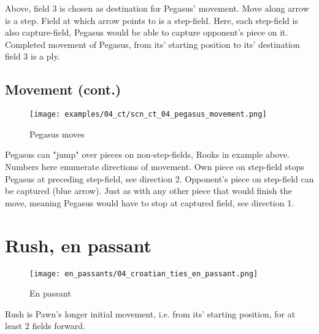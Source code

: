 Above, field 3 is chosen as destination for Pegasus' movement. Move along arrow is a step.
Field at which arrow points to is a step-field. Here, each step-field is also capture-field,
Pegasus would be able to capture opponent's piece on it. Completed movement of Pegasus,
from its' starting position to its' destination field 3 is a ply.

\clearpage %

\subsection*{Movement (cont.)}

\noindent
\begin{figure}[!h]
\vspace{-1.2\baselineskip}
\texttt{[image: examples/04\_ct/scn\_ct\_04\_pegasus\_movement.png]}
\caption{Pegasus moves}
\label{fig:scn_ct_04_pegasus_movement}
\end{figure}

Pegasus can "jump" over pieces on non-step-fields, Rooks in example above. Numbers
here enumerate directions of movement. Own piece on step-field stops Pegasus at
preceding step-field, see direction 2. Opponent's piece on step-field can be captured
(blue arrow). Just as with any other piece that would finish the move, meaning Pegasus
would have to stop at captured field, see direction 1.

\clearpage %

\section*{Rush, en passant}

\noindent
\begin{wrapfigure}{l}{0.4\textwidth}
\centering
\texttt{[image: en\_passants/04\_croatian\_ties\_en\_passant.png]}
\caption{En passant}
\label{fig:04_croatian_ties_en_passant}
\end{wrapfigure}
Rush is Pawn’s longer initial movement, i.e. from its’ starting position, for at least
2 fields forward.


